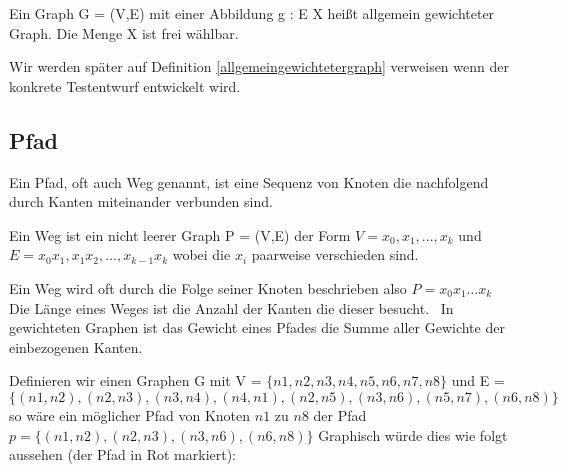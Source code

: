 \begin{definition}
    Ein Graph G = (V,E) mit einer Abbildung g : E \textrightarrow X heißt allgemein gewichteter Graph.
    Die Menge X ist frei wählbar.
    \label{allgemeingewichtetergraph}
\end{definition}

Wir werden später auf Definition \ref{allgemeingewichtetergraph} verweisen wenn der konkrete Testentwurf entwickelt wird.

\subsection{Pfad}

Ein Pfad, oft auch Weg genannt, ist eine Sequenz von Knoten die nachfolgend durch Kanten miteinander verbunden sind.~\cite[vgl. S. 7 0.3]{graphentheorie}

\begin{definition}
    Ein Weg ist ein nicht leerer Graph P = (V,E) der Form $V = {x_{0}, x_{1}, ..., x_{k}}$ und $E = {x_{0}x_{1}, x_{1}x_{2}, \ldots, x_{k-1}x_{k}}$ wobei die $x_{i}$
    paarweise verschieden sind.~\cite[vgl. S. 7]{graphentheorie}
\end{definition}

Ein Weg wird oft durch die Folge seiner Knoten beschrieben also $P=x_{0} x_{1} \ldots x_{k}$ \cite[vgl. S.7]{graphentheorie}
Die Länge eines Weges ist die Anzahl der Kanten die dieser besucht.~\cite[vgl. S. 7]{graphentheorie}
In gewichteten Graphen ist das Gewicht eines Pfades die Summe aller Gewichte der einbezogenen Kanten. \cite[vgl. 7.2 kürzeste Wege]{graphentheorie3}

\begin{example}
    Definieren wir einen Graphen G mit V = $\{n1,n2,n3,n4,n5,n6,n7,n8\}$ und E = $\{(n1,n2),(n2,n3),(n3,n4),(n4,n1),(n2,n5),(n3,n6),(n5,n7),(n6,n8)\}$
    so wäre ein möglicher Pfad von Knoten $n1$ zu $n8$ der Pfad $p = \{(n1, n2), (n2, n3), (n3, n6), (n6, n8)\}$
    Graphisch würde dies wie folgt aussehen (der Pfad in Rot markiert): \\ \\
    \begin{center}
    \end{center}
    \label{pfadbsp}
\end{example}

